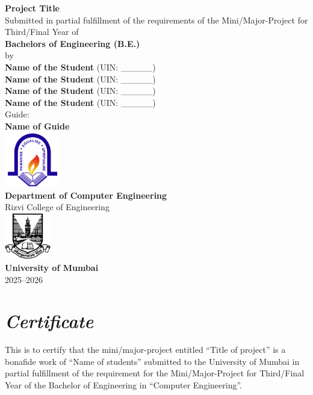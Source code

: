 \documentclass[12pt,a4paper,twoside,openright]{report}
\begin{document}
	
	\begin{titlepage}
		\centering
		\vspace*{0.2cm}
		\Huge \textbf{Project Title} \\[1cm]
		\large  {Submitted in partial fulfillment of the requirements of the Mini/Major-Project for Third/Final Year of} \\[0.5cm]
		\Large \textbf{Bachelors of Engineering (B.E.)} \\[0.5cm]
		\large by \\[0.5cm]
		\large \textbf{Name of the Student } (UIN: \_\_\_\_\_) \\
		\large \textbf{Name of the Student } (UIN: \_\_\_\_\_) \\
		\large \textbf{Name of the Student } (UIN: \_\_\_\_\_) \\
		\large \textbf{Name of the Student } (UIN: \_\_\_\_\_) \\ [1cm]
		 
		
		\large {Guide:} \\ 
		\large \textbf{Name of Guide} \\[1cm]
		
		\includegraphics[width=0.18\textwidth]{images/rcoe-logo.png}\\
		\Large \textbf{ Department of Computer Engineering} \\
		{\LARGE Rizvi College of Engineering} \\[1cm]
		
		\includegraphics[width=0.15\textwidth]{images/mu-logo.png}\\
		\LARGE \textbf{University of Mumbai} \\
		2025--2026 \\
	\end{titlepage}
	
	\em
	
	
	\chapter*{\centering \textit {Certificate}}
	This is to certify that the mini/major-project entitled “Title of project” is a bonafide work of “Name of students” submitted to the University of Mumbai in partial fulfillment of the requirement for the Mini/Major-Project for Third/Final Year of the Bachelor of Engineering in “Computer Engineering”.
	
\end{document}
